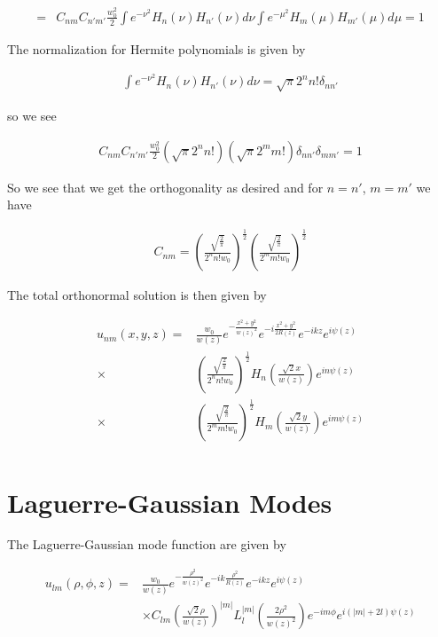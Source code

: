 \documentclass[12pt]{article}
\begin{document}
\begin{align}
=& C_{nm}C_{n'm'}  \frac{w_0^2}{2} \int e^{-\nu^2}H_n(\nu)H_{n'}(\nu)d\nu \int e^{-\mu^2}H_m(\mu)H_{m'}(\mu)d\mu=1
\end{align}

The normalization for Hermite polynomials is given by

\begin{align}
\int e^{-\nu^2}H_n(\nu)H_{n'}(\nu)d\nu = \sqrt{\pi}2^n n! \delta_{nn'}
\end{align}

so we see

\begin{align}
C_{nm}C_{n'm'} \frac{w_0^2}{2} (\sqrt{\pi}2^n n!)(\sqrt{\pi}2^m m!) \delta_{nn'}\delta_{mm'} = 1
\end{align}

So we see that we get the orthogonality as desired and for $n=n'$, $m=m'$ we have

\begin{align}
C_{nm} = \left(\frac{\sqrt{\frac{2}{\pi}}}{2^n n! w_0}\right)^{\frac{1}{2}}
\left(\frac{\sqrt{\frac{2}{\pi}}}{2^m m! w_0}\right)^{\frac{1}{2}}
\end{align}

The total orthonormal solution is then given by

\begin{align}
u_{nm}(x,y,z) = &\frac{w_0}{w(z)} e^{-\frac{x^2+y^2}{w(z)^2}} e^{-i\frac{x^2+y^2}{2R(z)}}e^{-ikz}e^{i\psi(z)}\\
\times & \left(\frac{\sqrt{\frac{2}{\pi}}}{2^n n! w_0}\right)^{\frac{1}{2}} H_n\left(\frac{\sqrt{2}x}{w(z)}\right) e^{in\psi(z)}\\
\times & \left(\frac{\sqrt{\frac{2}{\pi}}}{2^m m! w_0}\right)^{\frac{1}{2}} H_m\left(\frac{\sqrt{2}y}{w(z)}\right) e^{im\psi(z)}\\
\end{align}

\section{Laguerre-Gaussian Modes}

The Laguerre-Gaussian mode function are given by

\begin{align}
u_{lm}(\rho, \phi, z) =& \frac{w_0}{w(z)} e^{-\frac{\rho^2}{w(z)^2}} e^{-ik\frac{\rho^2}{R(z)}} e^{-ikz} e^{i\psi(z)}\\
& \times C_{lm} \left(\frac{\sqrt{2}\rho}{w(z)}\right)^{|m|} L_l^{|m|}\left(\frac{2\rho^2}{w(z)^2}\right) e^{-im\phi} e^{i(|m|+2l)\psi(z)}
\end{align}
\end{document}
